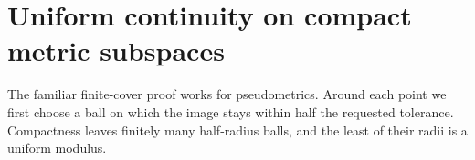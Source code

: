 \section{Uniform continuity on compact metric subspaces}










The familiar finite-cover proof works for pseudometrics.  Around each point
we first choose a ball on which the image stays within half the requested
tolerance. Compactness leaves finitely many half-radius balls, and the least
of their radii is a uniform modulus.

